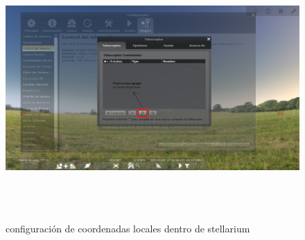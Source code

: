 \begin{figure}[H]
	\includegraphics[height=10cm,width=\textwidth]{stell_conf_red_2} 
	\caption{configuración de coordenadas locales dentro de stellarium} 
	\label{fig:stell_conf_red_2}
\end{figure}

